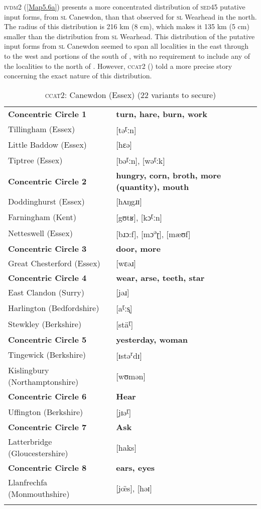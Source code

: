 \textsc{ivdm2} (\ref{Map5.6a}) presents a more concentrated distribution of \textsc{sed45} putative input forms, from \textsc{sl} Canewdon, than that observed for \textsc{sl} Wearhead in the north. The radius of this distribution is 216 km (8 cm), which makes it 135 km (5 cm) smaller than the distribution from \textsc{sl} Wearhead. This distribution of the putative input forms from \textsc{sl} Canewdon seemed to span all localities in the east through to the west and portions of the south of , with no requirement to include any of the localities to the north of . However, \textsc{ccat2} () told a more precise story concerning the exact nature of this distribution.

\begin{table}
\begin{tabularx}{\textwidth}{lQ}
\lsptoprule 
\textbf{Concentric Circle 1} & \textbf{turn, hare, burn, work} \\  
Tillingham (Essex) & [tə\textsuperscript{ɽ}ːn] \\
Little Baddow (Essex) &  [hɛə] \\
Tiptree (Essex) & [bə\textsuperscript{ɽ}ːn], [wə\textsuperscript{ɽ}ːk]  \\
\midrule
\textbf{Concentric Circle 2} & \textbf{hungry, corn, broth, more (quantity), mouth} \\
Doddinghurst (Essex) & [hʌŋgɹɪ]  \\
Farningham (Kent) &  [gʊtʁ], [kɔ\textsuperscript{ɽ}ːn]\\
Netteswell (Essex) &  [bɹɔ:f], [mɔ\textsuperscript{ə}ɽ], [mæʊf] \\
\midrule
\textbf{Concentric Circle 3} & \textbf{door, more}\\
Great Chesterford (Essex) & [wɛəɹ] \\
\midrule
\textbf{Concentric Circle 4} & \textbf{wear, arse, teeth, star}\\
East Clandon (Surry) & [jəɹ] \\
Harlington (Bedfordshire) & [a\textsuperscript{ɽ}ːs̨] \\
Stewkley (Berkshire) & [stä\textsuperscript{ɽ}] \\
\midrule
\textbf{Concentric Circle 5} & \textbf{yesterday, woman}\\
Tingewick (Berkshire) & [ɪstə\textsuperscript{r}dɪ]  \\
Kislingbury (Northamptonshire) & [wʊmən] \\
\midrule
\textbf{Concentric Circle 6} & \textbf{Hear}\\
Uffington (Berkshire) &  [jɪə\textsuperscript{ɽ}]\\
\midrule
\textbf{Concentric Circle 7} & \textbf{Ask}\\
Latterbridge (Gloucestershire) & [haks]\\
\midrule
\textbf{Concentric Circle 8} & \textbf{ears, eyes}\\
Llanfrechfa (Monmouthshire) &  [j\"œs],  [həɪ]  \\
\lspbottomrule 
\end{tabularx}
\caption{\textsc{ccat2}: Canewdon (Essex)  (22 variants to secure)}
\label{Table 5.3}
\end{table}

